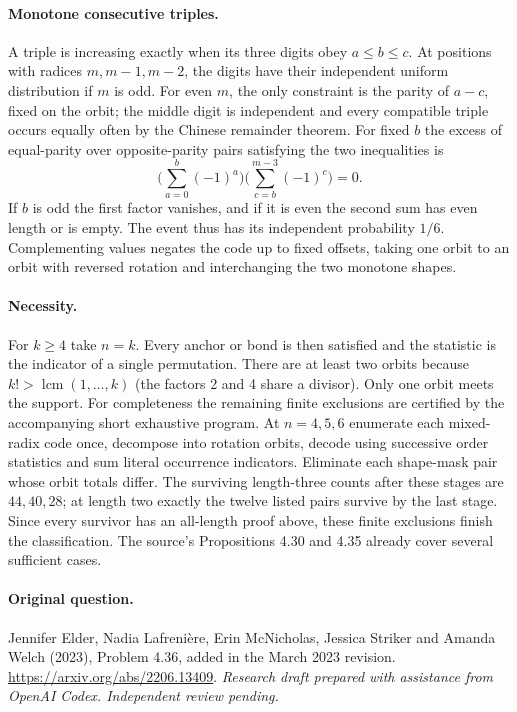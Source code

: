 \documentclass[11pt]{article}
\begin{document}
\paragraph{Monotone consecutive triples.} A triple is increasing exactly when its three digits obey $a\le b\le c$. At positions with radices $m,m-1,m-2$, the digits have their independent uniform distribution if $m$ is odd. For even $m$, the only constraint is the parity of $a-c$, fixed on the orbit; the middle digit is independent and every compatible triple occurs equally often by the Chinese remainder theorem. For fixed $b$ the excess of equal-parity over opposite-parity pairs satisfying the two inequalities is
\[
 \Big(\sum_{a=0}^{b}(-1)^a\Big)\Big(\sum_{c=b}^{m-3}(-1)^c\Big)=0.
\]
If $b$ is odd the first factor vanishes, and if it is even the second sum has even length or is empty. The event thus has its independent probability $1/6$. Complementing values negates the code up to fixed offsets, taking one orbit to an orbit with reversed rotation and interchanging the two monotone shapes.
\paragraph{Necessity.} For $k\ge4$ take $n=k$. Every anchor or bond is then satisfied and the statistic is the indicator of a single permutation. There are at least two orbits because $k!>\operatorname{lcm}(1,\ldots,k)$ (the factors 2 and 4 share a divisor). Only one orbit meets the support. For completeness the remaining finite exclusions are certified by the accompanying short exhaustive program. At $n=4,5,6$ enumerate each mixed-radix code once, decompose into rotation orbits, decode using successive order statistics and sum literal occurrence indicators. Eliminate each shape-mask pair whose orbit totals differ. The surviving length-three counts after these stages are $44,40,28$; at length two exactly the twelve listed pairs survive by the last stage. Since every survivor has an all-length proof above, these finite exclusions finish the classification. The source's Propositions 4.30 and 4.35 already cover several sufficient cases.

\paragraph{Original question.} Jennifer Elder, Nadia Lafrenière, Erin McNicholas, Jessica Striker and Amanda Welch (2023), Problem 4.36, added in the March 2023 revision. \url{https://arxiv.org/abs/2206.13409}.
\medskip\noindent\textit{Research draft prepared with assistance from OpenAI Codex. Independent review pending.}
\end{document}
